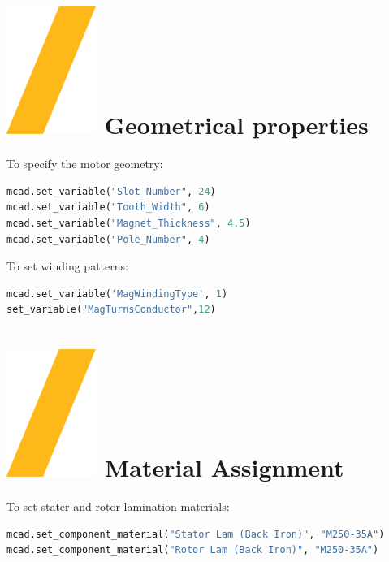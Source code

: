 \documentclass[landscape]{article}
\begin{document}
\begin{multicols}{3}
\section{\includegraphics[height=\fontcharht\font`\S]{slash.png} Geometrical properties}
To specify the motor geometry:
\begin{lstlisting}[language=Python]
mcad.set_variable("Slot_Number", 24)
mcad.set_variable("Tooth_Width", 6)
mcad.set_variable("Magnet_Thickness", 4.5)
mcad.set_variable("Pole_Number", 4)
\end{lstlisting}
To set winding patterns:
\begin{lstlisting}[language=Python]
mcad.set_variable('MagWindingType', 1)
set_variable("MagTurnsConductor",12)
\end{lstlisting}

\section{\includegraphics[height=\fontcharht\font`\S]{slash.png} Material Assignment}
To set stater and rotor lamination materials:
\begin{lstlisting}[language=Python]
mcad.set_component_material("Stator Lam (Back Iron)", "M250-35A")
mcad.set_component_material("Rotor Lam (Back Iron)", "M250-35A")
\end{lstlisting}


\end{multicols}
\end{document}
